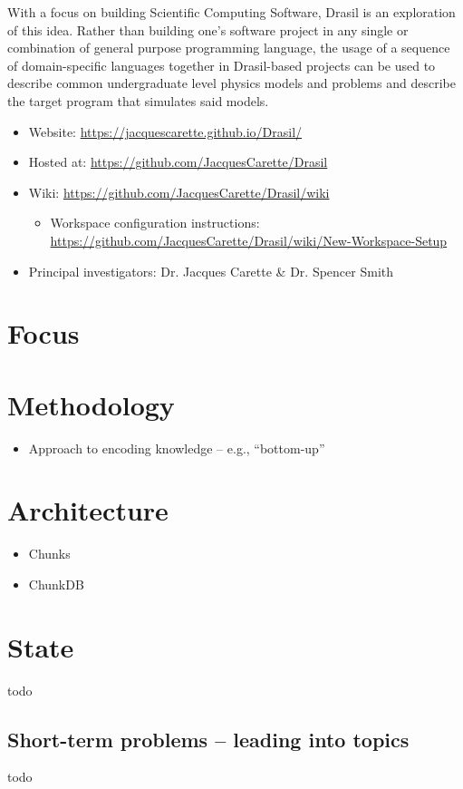 
With a focus on building Scientific Computing Software, Drasil is an
exploration of this idea. Rather than building one's software project in any
single or combination of general purpose programming language, the usage of a
sequence of domain-specific languages together in Drasil-based projects can be
used to describe common undergraduate level physics models and problems and
describe the target program that simulates said models.

\begin{itemize}
    \item Website: \url{https://jacquescarette.github.io/Drasil/}
    \item Hosted at: \url{https://github.com/JacquesCarette/Drasil}
    \item Wiki: \url{https://github.com/JacquesCarette/Drasil/wiki}
        \begin{itemize}
            \item Workspace configuration instructions: \url{https://github.com/JacquesCarette/Drasil/wiki/New-Workspace-Setup}
        \end{itemize}
    \item Principal investigators: Dr. Jacques Carette \& Dr. Spencer Smith
\end{itemize}

\section{Focus}

\section{Methodology}

\begin{itemize}
    \item Approach to encoding knowledge -- e.g., ``bottom-up''
\end{itemize}

\section{Architecture}

\begin{itemize}
    \item Chunks
    \item ChunkDB
\end{itemize}

\section{State}
todo

\subsection{Short-term problems -- leading into topics}
todo
